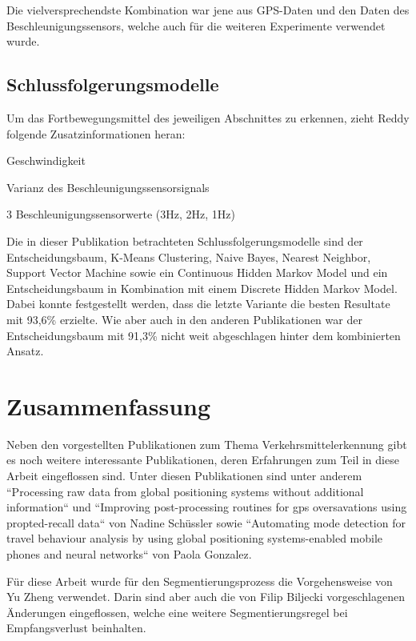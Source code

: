 Die vielversprechendste Kombination war jene aus GPS-Daten und den Daten des Beschleunigungssensors, welche auch  für die weiteren Experimente verwendet wurde.

\subsection{Schlussfolgerungsmodelle}
Um das Fortbewegungsmittel des jeweiligen Abschnittes zu erkennen, zieht Reddy folgende Zusatzinformationen heran:

\begin{pitemize}
\item Geschwindigkeit
\item Varianz des Beschleunigungssensorsignals
\item 3 Beschleunigungssensorwerte (3Hz, 2Hz, 1Hz)
\end{pitemize}

Die in dieser Publikation betrachteten Schlussfolgerungsmodelle sind der Entscheidungsbaum, K-Means Clustering, Naive Bayes, Nearest Neighbor, Support Vector Machine sowie ein Continuous Hidden Markov Model und ein Entscheidungsbaum in Kombination mit einem Discrete Hidden Markov Model. Dabei konnte festgestellt werden, dass die letzte Variante die besten Resultate mit 93,6\% erzielte. Wie aber auch in den anderen Publikationen war der Entscheidungsbaum mit 91,3\% nicht weit abgeschlagen hinter dem kombinierten Ansatz.

\section{Zusammenfassung}

Neben den vorgestellten Publikationen zum Thema Verkehrsmittelerkennung gibt es noch weitere interessante Publikationen, deren Erfahrungen zum Teil in diese Arbeit eingeflossen sind. Unter diesen Publikationen sind unter anderem ``Processing raw data from global positioning systems without additional information`` \cite{schuessler_processing_2009}  und  ``Improving post-processing routines for gps oversavations using propted-recall data`` \cite{nadine_schussler_improving_2011} von Nadine Schüssler sowie ``Automating mode detection for travel behaviour analysis by using global positioning systems-enabled mobile phones and neural networks`` \cite{gonzalez_automating_2010} von Paola Gonzalez.

Für diese Arbeit wurde für den Segmentierungsprozess die Vorgehensweise von Yu Zheng \cite{zheng_understanding_2010} verwendet. Darin sind aber auch die von Filip Biljecki \cite{biljecki_transportation_2013} vorgeschlagenen Änderungen eingeflossen, welche eine weitere Segmentierungsregel bei Empfangsverlust beinhalten. 

